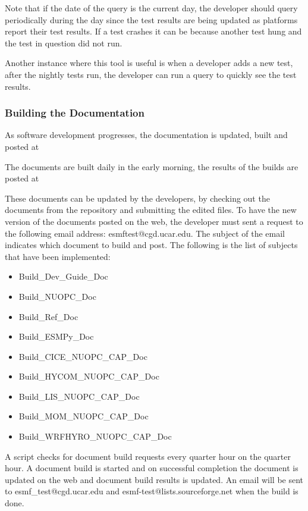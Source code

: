 Note that if the date of the query is the current day, the developer should query periodically during the day since
the test results are being updated as platforms report their test results.
If a test crashes it can be because another test hung and the test in question did not run.

Another instance where this tool is useful is when a developer adds a new test, after the nightly tests run, the developer can run a query to quickly see the test results.

\subsubsection{Building the Documentation}

As software development progresses, the documentation is updated, built and posted at

The documents are built daily in the early morning, the results of the builds are posted at

These documents can be updated by the developers, by checking out the documents from the repository and submitting the edited files. To have the new version of the documents posted on the web, the developer must sent a request to the following email address: esmftest@cgd.ucar.edu. The subject of the email indicates which document to build and post.
The following is the list of subjects that have been implemented:

\begin{itemize} 
\item Build\_Dev\_Guide\_Doc
\item Build\_NUOPC\_Doc
\item Build\_Ref\_Doc
\item Build\_ESMPy\_Doc
\item Build\_CICE\_NUOPC\_CAP\_Doc
\item Build\_HYCOM\_NUOPC\_CAP\_Doc
\item Build\_LIS\_NUOPC\_CAP\_Doc
\item Build\_MOM\_NUOPC\_CAP\_Doc
\item Build\_WRFHYRO\_NUOPC\_CAP\_Doc
\end{itemize}

A script checks for document build requests every quarter hour on the quarter hour. A document build is started and on successful completion the document is updated on the web and document build results is updated. An email will be sent to esmf\_test@cgd.ucar.edu and esmf-test@lists.sourceforge.net when the build is done.


